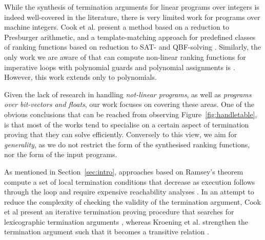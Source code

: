\documentclass[preprint]{sigplanconf}
\theoremstyle{definition}
\begin{document}

While the synthesis of termination arguments for linear programs over integers is indeed well-covered in the literature, 
there is very limited work for programs over machine integers.
Cook et al. present a method based on a reduction to Presburger
arithmetic, and a template-matching approach for predefined classes of
ranking functions based on reduction to SAT- and QBF-solving \cite{DBLP:conf/tacas/CookKRW10}.
Similarly, the only work we are aware of that can compute non-linear ranking functions  
for imperative loops with polynomial guards and polynomial assignments
is \cite{DBLP:conf/vmcai/BradleyMS05}. However, this work extends only to polynomials.

Given the lack of research in handling \emph{not-linear programs}, as well as \emph{programs over bit-vectors and floats},  
our work focuses on covering these areas. 
One of the obvious conclusions that can be reached from observing Figure~\ref{fig:handletable}, 
is that most of the works tend to specialise on a certain aspect of termination proving that they can solve efficiently. 
Conversely to this view, we aim for \emph{generality}, as we do not restrict the form of the synthesised ranking functions, nor the form of the input programs.


As mentioned in Section~\ref{sec:intro}, approaches based on Ramsey's theorem compute a set of local termination conditions that decrease as execution follows through the loop
and require expensive reachability analyses
\cite{DBLP:conf/lpe/CodishG03,DBLP:conf/lics/PodelskiR04,DBLP:conf/pldi/CookPR06}.
In an attempt to reduce the complexity of checking the validity of the termination argument, 
Cook et al present an iterative termination proving procedure that searches for 
lexicographic termination arguments \cite{DBLP:conf/tacas/CookSZ13}, 
whereas Kroening et al. strengthen the termination argument such that it becomes a transitive relation \cite{DBLP:conf/cav/KroeningSTW10}.
\end{document}

